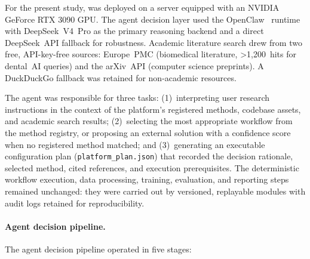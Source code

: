 

For the present study, \dentalclaw{} was deployed on a server equipped with an
NVIDIA GeForce RTX 3090 GPU. The agent decision layer used the OpenClaw~\cite{openclaw}
runtime with DeepSeek~V4~Pro as the primary reasoning backend and a
direct DeepSeek~API fallback for robustness. Academic literature search drew from
two free, API-key-free sources: Europe~PMC (biomedical literature,
\textgreater1,200~hits for dental~AI queries) and the arXiv~API (computer science
preprints). A DuckDuckGo fallback was retained for non-academic resources.

The agent was responsible for three tasks: (1)~interpreting user research
instructions in the context of the platform's registered methods, codebase assets,
and academic search results; (2)~selecting the most appropriate workflow from the
method registry, or proposing an external solution with a confidence score when no
registered method matched; and (3)~generating an executable configuration plan
(\texttt{platform\_plan.json}) that recorded the decision rationale, selected
method, cited references, and execution prerequisites. The deterministic
workflow execution, data processing, training, evaluation, and reporting steps
remained unchanged: they were carried out by versioned, replayable modules with
audit logs retained for reproducibility.



\paragraph{Agent decision pipeline.}
The agent decision pipeline operated in five stages:

